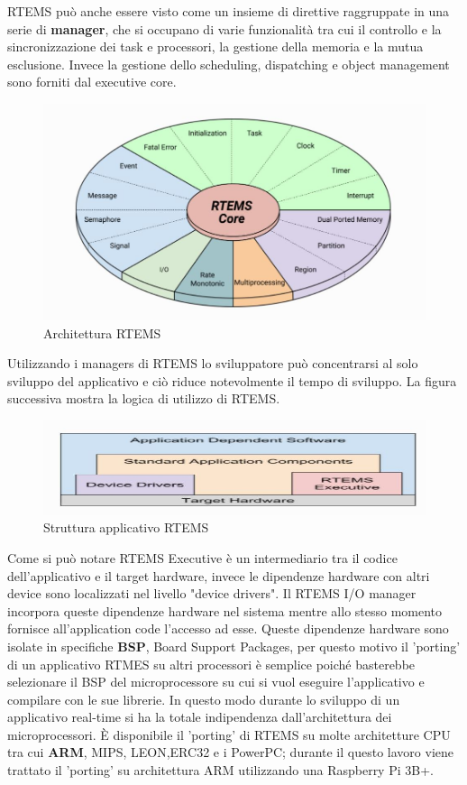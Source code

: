 \documentclass[12pt, a4paper, titlepage, oneside]{book}
\begin{document}
RTEMS può anche essere visto come un insieme di direttive raggruppate in una serie di \textbf{manager}, che si occupano di varie funzionalità tra cui il controllo e la sincronizzazione dei task e processori, la gestione della memoria e la mutua esclusione. Invece la gestione dello scheduling, dispatching e object management sono forniti dal executive core.
\begin{figure} [h]
    \centering
    \includegraphics[scale = 0.75]{rtems_internal_architecture.JPG}
    \caption{Architettura RTEMS}
    \label{fig:my_label1}
\end{figure}
Utilizzando i managers di RTEMS lo sviluppatore può concentrarsi al solo sviluppo del applicativo e ciò riduce notevolmente il tempo di sviluppo.\newline
La figura successiva mostra la logica di utilizzo di RTEMS.
\begin{figure}[h]
    \centering
    \includegraphics[scale = 0.75]{application_architecture.JPG}
    \caption{Struttura applicativo RTEMS}
    \label{fig:my_label2}
\end{figure}
Come si può notare RTEMS Executive è un intermediario tra il codice dell'applicativo e il target hardware, invece le dipendenze hardware con altri device sono localizzati nel livello "device drivers".
Il RTEMS I/O manager incorpora queste dipendenze hardware nel sistema mentre allo stesso momento fornisce all'application code l'accesso ad esse.
Queste dipendenze hardware sono isolate in specifiche \textbf{BSP}, Board Support Packages, per questo motivo il 'porting' di un applicativo RTMES su altri processori è semplice poiché basterebbe selezionare il BSP del microprocessore su cui si vuol eseguire l'applicativo e compilare con le sue librerie.\newline
In questo modo durante lo sviluppo di un applicativo real-time si ha la totale indipendenza dall'architettura dei microprocessori. \newline
È disponibile il 'porting' di RTEMS su molte architetture CPU tra cui\textbf{ ARM}, MIPS, LEON,ERC32 e i PowerPC; durante il questo lavoro viene trattato il 'porting' su architettura ARM utilizzando una Raspberry Pi 3B+.
\end{document}
